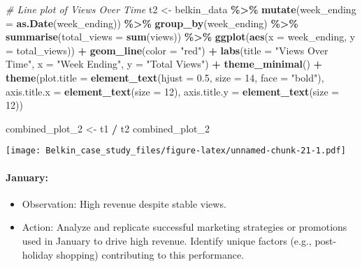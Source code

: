 \documentclass[
]{article}
\newenvironment{Shaded}{\begin{snugshade}}{\end{snugshade}}
\newcommand{\AttributeTok}[1]{\textcolor[rgb]{0.13,0.29,0.53}{#1}}
\newcommand{\CommentTok}[1]{\textcolor[rgb]{0.56,0.35,0.01}{\textit{#1}}}
\newcommand{\DecValTok}[1]{\textcolor[rgb]{0.00,0.00,0.81}{#1}}
\newcommand{\FloatTok}[1]{\textcolor[rgb]{0.00,0.00,0.81}{#1}}
\newcommand{\FunctionTok}[1]{\textcolor[rgb]{0.13,0.29,0.53}{\textbf{#1}}}
\newcommand{\NormalTok}[1]{#1}
\newcommand{\OtherTok}[1]{\textcolor[rgb]{0.56,0.35,0.01}{#1}}
\newcommand{\SpecialCharTok}[1]{\textcolor[rgb]{0.81,0.36,0.00}{\textbf{#1}}}
\newcommand{\StringTok}[1]{\textcolor[rgb]{0.31,0.60,0.02}{#1}}
\providecommand{\tightlist}{%
  \setlength{\itemsep}{0pt}\setlength{\parskip}{0pt}}
\begin{document}
\begin{Shaded}
\begin{Highlighting}[]
\CommentTok{\# Line plot of Views Over Time}
\NormalTok{t2 }\OtherTok{\textless{}{-}}\NormalTok{ belkin\_data }\SpecialCharTok{\%\textgreater{}\%}
  \FunctionTok{mutate}\NormalTok{(}\AttributeTok{week\_ending =} \FunctionTok{as.Date}\NormalTok{(week\_ending)) }\SpecialCharTok{\%\textgreater{}\%}
  \FunctionTok{group\_by}\NormalTok{(week\_ending) }\SpecialCharTok{\%\textgreater{}\%}
  \FunctionTok{summarise}\NormalTok{(}\AttributeTok{total\_views =} \FunctionTok{sum}\NormalTok{(views)) }\SpecialCharTok{\%\textgreater{}\%}
  \FunctionTok{ggplot}\NormalTok{(}\FunctionTok{aes}\NormalTok{(}\AttributeTok{x =}\NormalTok{ week\_ending, }\AttributeTok{y =}\NormalTok{ total\_views)) }\SpecialCharTok{+}
  \FunctionTok{geom\_line}\NormalTok{(}\AttributeTok{color =} \StringTok{"red"}\NormalTok{) }\SpecialCharTok{+}
  \FunctionTok{labs}\NormalTok{(}\AttributeTok{title =} \StringTok{"Views Over Time"}\NormalTok{,}
       \AttributeTok{x =} \StringTok{"Week Ending"}\NormalTok{,}
       \AttributeTok{y =} \StringTok{"Total Views"}\NormalTok{) }\SpecialCharTok{+}
  \FunctionTok{theme\_minimal}\NormalTok{() }\SpecialCharTok{+}
  \FunctionTok{theme}\NormalTok{(}\AttributeTok{plot.title =} \FunctionTok{element\_text}\NormalTok{(}\AttributeTok{hjust =} \FloatTok{0.5}\NormalTok{, }\AttributeTok{size =} \DecValTok{14}\NormalTok{, }\AttributeTok{face =} \StringTok{"bold"}\NormalTok{),}
        \AttributeTok{axis.title.x =} \FunctionTok{element\_text}\NormalTok{(}\AttributeTok{size =} \DecValTok{12}\NormalTok{),}
        \AttributeTok{axis.title.y =} \FunctionTok{element\_text}\NormalTok{(}\AttributeTok{size =} \DecValTok{12}\NormalTok{))}

\NormalTok{combined\_plot\_2 }\OtherTok{\textless{}{-}}\NormalTok{ t1 }\SpecialCharTok{/}\NormalTok{ t2}
\NormalTok{combined\_plot\_2}
\end{Highlighting}
\end{Shaded}

\texttt{[image: Belkin\_case\_study\_files/figure-latex/unnamed-chunk-21-1.pdf]}

\paragraph{January:}\label{january}

\begin{itemize}
\tightlist
\item
  Observation: High revenue despite stable views.
\item
  Action: Analyze and replicate successful marketing strategies or
  promotions used in January to drive high revenue. Identify unique
  factors (e.g., post-holiday shopping) contributing to this
  performance.
\end{itemize}
\end{document}
